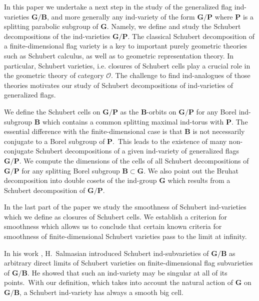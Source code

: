 \documentclass[12pt]{amsart}
\theoremstyle{definition}
\begin{document}
In this paper we undertake a next step in the study of the generalized flag ind-varieties $\mathbf{G}/\mathbf{B}$, and more generally any ind-variety of the form $\mathbf{G}/\mathbf{P}$ where $\mathbf{P}$ is a splitting parabolic subgroup of $\mathbf{G}$. Namely, we define and study the Schubert decompositions of the ind-varieties  $\mathbf{G}/\mathbf{P}$.
The classical Schubert decomposition of a finite-dimensional flag variety is a key
to important purely geometric theories such as Schubert calculus, as well as to geometric representation theory. In particular, Schubert varieties, i.e. closures of Schubert cells play a crucial role in the geometric theory of category $\mathcal{O}$. The challenge to find
ind-analogues of those theories motivates our study of Schubert decompositions of ind-varieties
of generalized flags.

We define the Schubert cells on $\mathbf{G}/\mathbf{P}$ as the $\mathbf{B}$-orbits on $\mathbf{G}/\mathbf{P}$ for any Borel ind-subgroup $\mathbf{B}$ which contains a common splitting maximal ind-torus with $\mathbf{P}$. The essential difference with the finite-dimensional case is that $\mathbf{B}$ is not necessarily conjugate to a Borel subgroup of $\mathbf{P}$.\ This leads to the existence of many non-conjugate Schubert decompositions of a given ind-variety of generalized flags $\mathbf{G}/\mathbf{P}$. We compute the dimensions of the cells of all Schubert decompositions of $\mathbf{G}/\mathbf{P}$ for any splitting Borel subgroup $\mathbf{B}\subset \mathbf{G}$. We also point out the Bruhat decomposition into double cosets of the ind-group $\mathbf{G}$ which results from a Schubert decomposition of $\mathbf{G}/\mathbf{P}$.

In the last part of the paper we study the smoothness of Schubert ind-varieties which we define as closures of Schubert cells. We establish a criterion for smoothness which allows us to conclude that certain known criteria for smoothness of finite-dimensional Schubert varieties pass to the limit at infinity.

In his work \cite{Salmasian}, H.\ Salmasian introduced Schubert ind-subvarieties of $\mathbf{G}/\mathbf{B}$ as arbitrary direct limits of Schubert varieties on finite-dimensional flag subvarieties of $\mathbf{G}/\mathbf{B}$. He showed that such an ind-variety may be singular at all of its points.\ With our definition, which takes into account the natural action of $\mathbf{G}$ on $\mathbf{G}/\mathbf{B}$, a Schubert ind-variety has always a smooth big cell.
\end{document}
